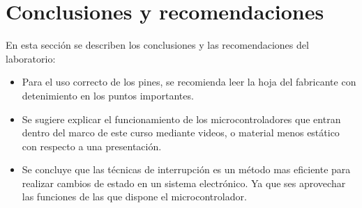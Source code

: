 \documentclass[12pt,letterpaper]{article}     %
\begin{document}
\section{Conclusiones y recomendaciones}
En esta secci\'on se describen los conclusiones y las recomendaciones del laboratorio:

\begin{itemize}
    \item Para el uso correcto de los pines, se recomienda leer la hoja del fabricante con detenimiento en los puntos importantes. 
    \item Se sugiere explicar el funcionamiento de los microcontroladores que entran dentro del marco de este curso mediante videos, o material menos est\'atico con respecto a una presentaci\'on. 
    \item Se concluye que las técnicas de interrupción es un método mas eficiente para realizar cambios de estado en un sistema electrónico. Ya que ses aprovechar las funciones de las que dispone el microcontrolador.
\end{itemize}


\newpage





%




\end{document}
